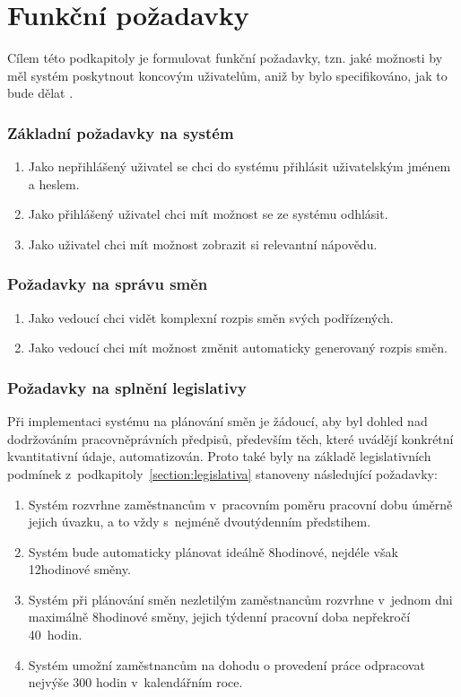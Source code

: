 \documentclass[twoside]{ctuthesis}
\begin{document}
\section{Funkční požadavky}
Cílem této podkapitoly je formulovat funkční požadavky, tzn. jaké možnosti by měl systém poskytnout koncovým uživatelům, aniž by bylo specifikováno, jak to bude dělat \cite{lauesen2002}.

\subsubsection{Základní požadavky na systém}
\begin{enumerate}
	\item Jako nepřihlášený uživatel se chci do systému přihlásit uživatelským jménem a heslem.
	\item Jako přihlášený uživatel chci mít možnost se ze systému odhlásit.
	\item Jako uživatel chci mít možnost zobrazit si relevantní nápovědu.
\end{enumerate}

\subsubsection{Požadavky na správu směn}
\begin{enumerate}
	\item Jako vedoucí chci vidět komplexní rozpis směn svých podřízených.
	\item Jako vedoucí chci mít možnost změnit automaticky generovaný rozpis směn.
\end{enumerate}

\subsubsection{Požadavky na splnění legislativy}
Při implementaci systému na plánování směn je žádoucí, aby byl dohled nad dodržováním pracovněprávních předpisů, především těch, které uvádějí konkrétní kvantitativní údaje, automatizován. Proto také byly na základě legislativních podmínek z~podkapitoly~\ref{section:legislativa} stanoveny následující požadavky:

\begin{enumerate}
	\item Systém rozvrhne zaměstnancům v~pracovním poměru pracovní dobu úměrně jejich úvazku, a to vždy s~nejméně dvoutýdenním předstihem.
	\item Systém bude automaticky plánovat ideálně 8hodinové, nejdéle však 12hodinové směny.
	\item Systém při plánování směn nezletilým zaměstnancům rozvrhne v~jednom dni maximálně 8hodinové směny, jejich týdenní pracovní doba nepřekročí 40~hodin.
	\item Systém umožní zaměstnancům na dohodu o provedení práce odpracovat nejvýše 300 hodin v~kalendářním roce.

\end{enumerate}
\end{document}
